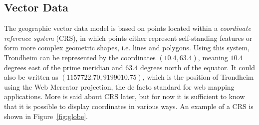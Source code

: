 \subsection{Vector Data}
The geographic vector data model is based on points located within a \textit{coordinate reference system} (CRS), in which points either represent self-standing features or form more complex geometric shapes, i.e. lines and polygons. Using this system, Trondheim can be represented by the coordinates $\left(10.4, 63.4\right)$, meaning $10.4$ degrees east of the prime meridian and $63.4$ degrees north of the equator. It could also be written as $\left(1157722.70, 9199010.75\right)$, which is the position of Trondheim using the Web Mercator projection, the de facto standard for web mapping applications. More is said about CRS later, but for now it is sufficient to know that it is possible to display coordinates in various ways. An example of a CRS is shown in Figure~\ref{fig:globe}.

